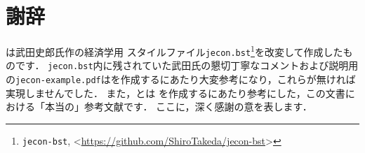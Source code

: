 \clearpage
\section*{謝辞}
\label{sec:acknowledgment}
\jsmefile は武田史郎氏作の経済学用 \BibTeX スタイルファイル\verb|jecon.bst|\footnote{\texttt{jecon-bst}, \textless\url{https://github.com/ShiroTakeda/jecon-bst}\textgreater}を改変して作成したものです．
\verb|jecon.bst|内に残されていた武田氏の懇切丁寧なコメントおよび説明用の\verb|jecon-example.pdf|は\jsmefile を作成するにあたり大変参考になり，これらが無ければ実現しませんでした．
また，\citet{奥村:技評2020}と\citet{吉永:翔泳社2018}は \JSMErepos を作成するにあたり参考にした，この文書における「本当の」参考文献です．
ここに，深く感謝の意を表します．